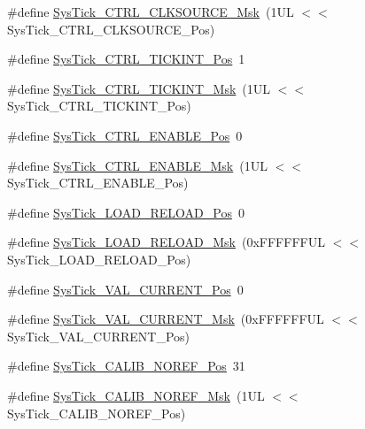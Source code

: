 \begin{DoxyCompactItemize}
\item 
\#define \mbox{\hyperlink{group___c_m_s_i_s___sys_tick_gaa41d06039797423a46596bd313d57373}{Sys\+Tick\+\_\+\+C\+T\+R\+L\+\_\+\+C\+L\+K\+S\+O\+U\+R\+C\+E\+\_\+\+Msk}}~(1\+U\+L $<$$<$ Sys\+Tick\+\_\+\+C\+T\+R\+L\+\_\+\+C\+L\+K\+S\+O\+U\+R\+C\+E\+\_\+\+Pos)
\item 
\#define \mbox{\hyperlink{group___c_m_s_i_s___sys_tick_ga88f45bbb89ce8df3cd2b2613c7b48214}{Sys\+Tick\+\_\+\+C\+T\+R\+L\+\_\+\+T\+I\+C\+K\+I\+N\+T\+\_\+\+Pos}}~1
\item 
\#define \mbox{\hyperlink{group___c_m_s_i_s___sys_tick_ga95bb984266ca764024836a870238a027}{Sys\+Tick\+\_\+\+C\+T\+R\+L\+\_\+\+T\+I\+C\+K\+I\+N\+T\+\_\+\+Msk}}~(1\+U\+L $<$$<$ Sys\+Tick\+\_\+\+C\+T\+R\+L\+\_\+\+T\+I\+C\+K\+I\+N\+T\+\_\+\+Pos)
\item 
\#define \mbox{\hyperlink{group___c_m_s_i_s___sys_tick_ga0b48cc1e36d92a92e4bf632890314810}{Sys\+Tick\+\_\+\+C\+T\+R\+L\+\_\+\+E\+N\+A\+B\+L\+E\+\_\+\+Pos}}~0
\item 
\#define \mbox{\hyperlink{group___c_m_s_i_s___sys_tick_ga16c9fee0ed0235524bdeb38af328fd1f}{Sys\+Tick\+\_\+\+C\+T\+R\+L\+\_\+\+E\+N\+A\+B\+L\+E\+\_\+\+Msk}}~(1\+U\+L $<$$<$ Sys\+Tick\+\_\+\+C\+T\+R\+L\+\_\+\+E\+N\+A\+B\+L\+E\+\_\+\+Pos)
\item 
\#define \mbox{\hyperlink{group___c_m_s_i_s___sys_tick_gaf44d10df359dc5bf5752b0894ae3bad2}{Sys\+Tick\+\_\+\+L\+O\+A\+D\+\_\+\+R\+E\+L\+O\+A\+D\+\_\+\+Pos}}~0
\item 
\#define \mbox{\hyperlink{group___c_m_s_i_s___sys_tick_ga265912a7962f0e1abd170336e579b1b1}{Sys\+Tick\+\_\+\+L\+O\+A\+D\+\_\+\+R\+E\+L\+O\+A\+D\+\_\+\+Msk}}~(0x\+F\+F\+F\+F\+F\+F\+U\+L $<$$<$ Sys\+Tick\+\_\+\+L\+O\+A\+D\+\_\+\+R\+E\+L\+O\+A\+D\+\_\+\+Pos)
\item 
\#define \mbox{\hyperlink{group___c_m_s_i_s___sys_tick_ga3208104c3b019b5de35ae8c21d5c34dd}{Sys\+Tick\+\_\+\+V\+A\+L\+\_\+\+C\+U\+R\+R\+E\+N\+T\+\_\+\+Pos}}~0
\item 
\#define \mbox{\hyperlink{group___c_m_s_i_s___sys_tick_gafc77b56d568930b49a2474debc75ab45}{Sys\+Tick\+\_\+\+V\+A\+L\+\_\+\+C\+U\+R\+R\+E\+N\+T\+\_\+\+Msk}}~(0x\+F\+F\+F\+F\+F\+F\+U\+L $<$$<$ Sys\+Tick\+\_\+\+V\+A\+L\+\_\+\+C\+U\+R\+R\+E\+N\+T\+\_\+\+Pos)
\item 
\#define \mbox{\hyperlink{group___c_m_s_i_s___sys_tick_ga534dbe414e7a46a6ce4c1eca1fbff409}{Sys\+Tick\+\_\+\+C\+A\+L\+I\+B\+\_\+\+N\+O\+R\+E\+F\+\_\+\+Pos}}~31
\item 
\#define \mbox{\hyperlink{group___c_m_s_i_s___sys_tick_ga3af0d891fdd99bcc8d8912d37830edb6}{Sys\+Tick\+\_\+\+C\+A\+L\+I\+B\+\_\+\+N\+O\+R\+E\+F\+\_\+\+Msk}}~(1\+U\+L $<$$<$ Sys\+Tick\+\_\+\+C\+A\+L\+I\+B\+\_\+\+N\+O\+R\+E\+F\+\_\+\+Pos)

\end{DoxyCompactItemize}
